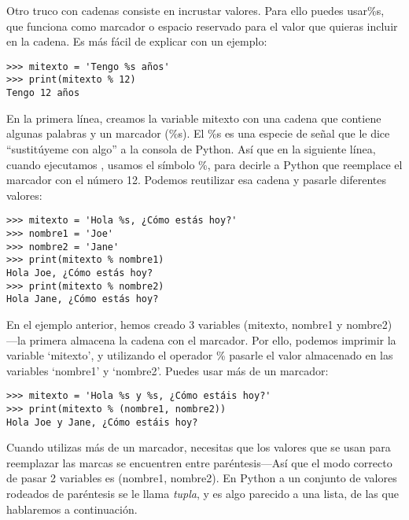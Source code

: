 Otro truco con cadenas consiste en incrustar valores.  Para ello puedes usar\%s, que funciona como marcador o espacio reservado para el valor que quieras incluir en la cadena. Es más fácil de explicar con un ejemplo:

\begin{listing}
\begin{verbatim}
>>> mitexto = 'Tengo %s años'
>>> print(mitexto % 12)
Tengo 12 años
\end{verbatim}
\end{listing}

En la primera línea, creamos la variable mitexto con una cadena que contiene algunas palabras y un marcador (\%s). El \%s es una especie de señal que le dice ``sustitúyeme con algo'' a la consola de Python. Así que en la siguiente línea, cuando ejecutamos , usamos el símbolo \%, para decirle a Python que reemplace el marcador con el número 12. Podemos reutilizar esa cadena y pasarle diferentes valores:

\begin{listing}
\begin{verbatim}
>>> mitexto = 'Hola %s, ¿Cómo estás hoy?'
>>> nombre1 = 'Joe'
>>> nombre2 = 'Jane'
>>> print(mitexto % nombre1)
Hola Joe, ¿Cómo estás hoy?
>>> print(mitexto % nombre2)
Hola Jane, ¿Cómo estás hoy?
\end{verbatim}
\end{listing}

En el ejemplo anterior, hemos creado 3 variables (mitexto, nombre1 y nombre2)---la primera almacena la cadena con el marcador. Por ello, podemos imprimir la variable `mitexto', y utilizando el operador \% pasarle el valor almacenado en las variables `nombre1' y `nombre2'.  Puedes usar más de un marcador:

\begin{listing}
\begin{verbatim}
>>> mitexto = 'Hola %s y %s, ¿Cómo estáis hoy?'
>>> print(mitexto % (nombre1, nombre2))
Hola Joe y Jane, ¿Cómo estáis hoy?
\end{verbatim}
\end{listing}

Cuando utilizas más de un marcador, necesitas que los valores que se usan para reemplazar las marcas se encuentren entre paréntesis---Así que el modo correcto de pasar 2 variables es (nombre1, nombre2). En Python a un conjunto de valores rodeados de paréntesis se le llama \emph{tupla}, y es algo parecido a una lista, de las que hablaremos a continuación.

